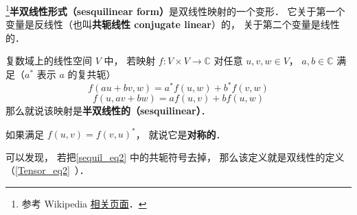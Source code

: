 
\begin{issues}
\issueDraft
\end{issues}

\footnote{参考 Wikipedia \href{https://en.wikipedia.org/wiki/Sesquilinear_form}{相关页面}．}\textbf{半双线性形式（sesquilinear form）}是双线性映射的一个变形． 它关于第一个变量是反线性（也叫\textbf{共轭线性 conjugate linear}）的， 关于第二个变量是线性的．
\begin{definition}{}\label{sequil_def1}
复数域上的线性空间 $V$ 中， 若映射 $f:V\times V\to \mathbb C$ 对任意 $u, v, w\in V$， $a,b\in \mathbb C$ 满足（$a^*$ 表示 $a$ 的复共轭）
\begin{equation}\label{sequil_eq2}
f(au+bv, w) = a^*f(u, w) + b^*f(v, w)
\end{equation}
\begin{equation}\label{sequil_eq1}
f(u, av+bw) = af(u, v) + bf(u, w)
\end{equation}
那么就说该映射是\textbf{半双线性的（sesquilinear）}．
\end{definition}
如果满足 $f(u, v) = f(v, u)^*$， 就说它是\textbf{对称的}．

可以发现， 若把\autoref{sequil_eq2} 中的共轭符号去掉， 那么该定义就是双线性的定义（\autoref{Tensor_eq2}~）．

